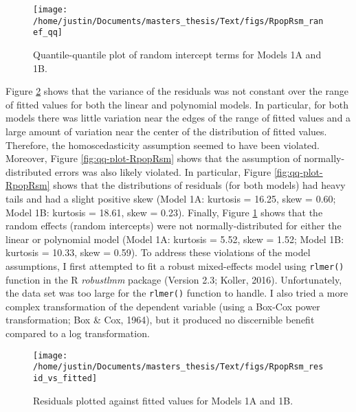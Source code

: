 \documentclass[
  english,
  man]{apa6}
\begin{document}
\begin{appendix}
\begin{figure}

{\centering \texttt{[image: /home/justin/Documents/masters\_thesis/Text/figs/RpopRsm\_ranef\_qq]} 

}

\caption{Quantile-quantile plot of random intercept terms for Models 1A and 1B.}\label{fig:qq-plot-randInt-RpopRsm}
\end{figure}

Figure \ref{fig:residuals-vs-fitted-RpopRsm} shows that the variance of
the residuals was not constant over the range of fitted values for both
the linear and polynomial models. In particular, for both models there
was little variation near the edges of the range of fitted values and a
large amount of variation near the center of the distribution of fitted
values. Therefore, the homoscedasticity assumption seemed to have been
violated. Moreover, Figure \ref{fig:qq-plot-RpopRsm} shows that the
assumption of normally-distributed errors was also likely violated. In
particular, Figure \ref{fig:qq-plot-RpopRsm} shows that the
distributions of residuals (for both models) had heavy tails and had a
slight positive skew (Model 1A: kurtosis = 16.25, skew = 0.60; Model 1B:
kurtosis = 18.61, skew = 0.23). Finally, Figure
\ref{fig:qq-plot-randInt-RpopRsm} shows that the random effects (random
intercepts) were not normally-distributed for either the linear or
polynomial model (Model 1A: kurtosis = 5.52, skew = 1.52; Model 1B:
kurtosis = 10.33, skew = 0.59). To address these violations of the model
assumptions, I first attempted to fit a robust mixed-effects model using
\texttt{rlmer()} function in the R \emph{robustlmm} package (Version
2.3; Koller, 2016). Unfortunately, the data set was too large for the
\texttt{rlmer()} function to handle. I also tried a more complex
transformation of the dependent variable (using a Box-Cox power
transformation; Box \& Cox, 1964), but it produced no discernible
benefit compared to a log transformation.

\begin{figure}

{\centering \texttt{[image: /home/justin/Documents/masters\_thesis/Text/figs/RpopRsm\_resid\_vs\_fitted]} 

}

\caption{Residuals plotted against fitted values for Models 1A and 1B.}\label{fig:residuals-vs-fitted-RpopRsm}
\end{figure}


\end{appendix}
\end{document}
